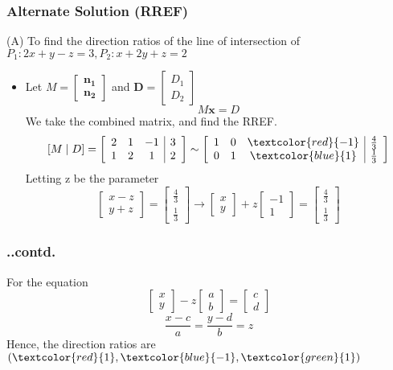 \documentclass{beamer}
\let\vec\mathbf
\begin{document}
\begin{frame}
\frametitle{Alternate Solution (RREF)}
(A) To find the direction ratios of the line of intersection of $P_{1}: 2x + y - z = 3,P_{2}: x + 2y + z = 2$
\begin{itemize}
    \item Let $M=\begin{bmatrix}\vec{n_{1}}\\\vec{n_{2}} \end{bmatrix}$ and $\vec{D}=\begin{bmatrix}D_{1}\\D_{2} \end{bmatrix}$
    \[
        M\vec{x}=D
    \]
    We take the combined matrix, and find the RREF.
    \[ [M \mid D]=\left[
        \begin{array}{ccc|c}
         2 & 1 & -1 & 3\\1 & 2 & 1 & 2
        \end{array}
        \right]
        \sim
        \left[
        \begin{array}{ccc|c}
         1 & 0 & \textcolor{red}{-1} & \tfrac{4}{3}\\0 & 1 & \textcolor{blue}{1} & \tfrac{1}{3}
        \end{array}
        \right]
    \]
        Letting z be the parameter
     \[ 
     \begin{bmatrix}x-z\\y+z\end{bmatrix}=\begin{bmatrix}\tfrac{4}{3}\\\tfrac{1}{3}\end{bmatrix}\rightarrow\begin{bmatrix}x\\y\end{bmatrix}+z\begin{bmatrix}-1\\1\end{bmatrix}=\begin{bmatrix}\tfrac{4}{3}\\\tfrac{1}{3}\end{bmatrix}
    \]
\end{itemize}
\end{frame}
\begin{frame}
\frametitle{..contd.}

For the equation
	\[
	\begin{bmatrix}x\\y\end{bmatrix}-z\begin{bmatrix}a\\b\end{bmatrix}=\begin{bmatrix}c\\d\end{bmatrix}
	\]
	\[
	\frac{x-c}{a}=\frac{y-d}{b}=z
	\]
Hence, the direction ratios are $(\textcolor{red}{1},\textcolor{blue}{-1},\textcolor{green}{1})$

	
\end{frame}
\end{document}
